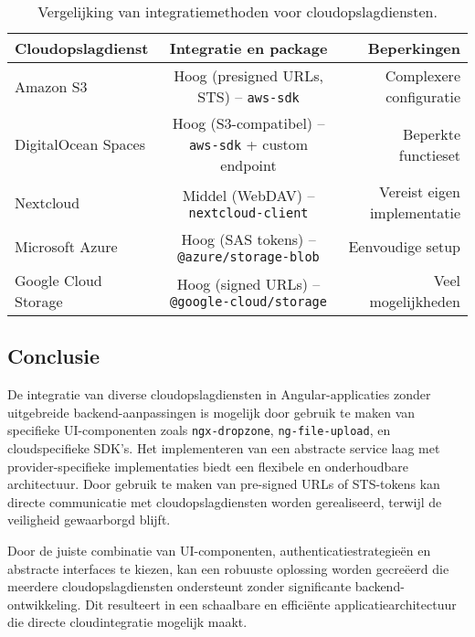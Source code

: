 \begin{table}[H]
    \centering
    \footnotesize
    \begin{tabular}{lcr}
      \toprule
      \textbf{Cloudopslagdienst} & \textbf{Integratie en package} & \textbf{Beperkingen} \\
      \midrule
      Amazon S3 & Hoog (presigned URLs, STS) – \texttt{aws-sdk} & Complexere configuratie \\
      DigitalOcean Spaces & Hoog (S3-compatibel) – \texttt{aws-sdk} + custom endpoint & Beperkte functieset \\
      Nextcloud & Middel (WebDAV) – \texttt{nextcloud-client} & Vereist eigen implementatie \\
      Microsoft Azure & Hoog (SAS tokens) – \texttt{@azure/storage-blob} & Eenvoudige setup \\
      Google Cloud Storage & Hoog (signed URLs) – \texttt{@google-cloud/storage} & Veel mogelijkheden \\
      \bottomrule
    \end{tabular}
    \caption[Vergelijking cloudintegraties]{\label{tab:cloud-vergelijking}Vergelijking van integratiemethoden voor cloudopslagdiensten.}
 \end{table}

\subsection{Conclusie}

De integratie van diverse cloudopslagdiensten in Angular-applicaties zonder uitgebreide backend-aanpassingen is mogelijk door gebruik te maken van specifieke UI-componenten zoals \texttt{ngx-dropzone}, \texttt{ng-file-upload}, en cloudspecifieke SDK's. Het implementeren van een abstracte service laag met provider-specifieke implementaties biedt een flexibele en onderhoudbare architectuur. Door gebruik te maken van pre-signed URLs of STS-tokens kan directe communicatie met cloudopslagdiensten worden gerealiseerd, terwijl de veiligheid gewaarborgd blijft.

Door de juiste combinatie van UI-componenten, authenticatiestrategieën en abstracte interfaces te kiezen, kan een robuuste oplossing worden gecreëerd die meerdere cloudopslagdiensten ondersteunt zonder significante backend-ontwikkeling. Dit resulteert in een schaalbare en efficiënte applicatiearchitectuur die directe cloudintegratie mogelijk maakt.
